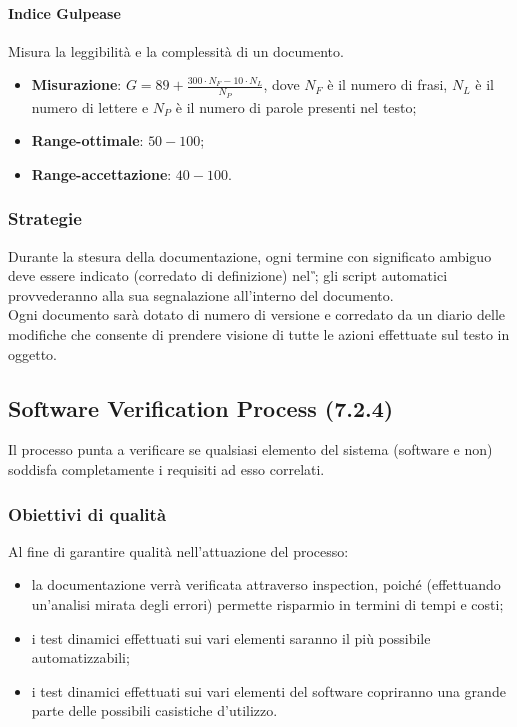 \paragraph{Indice Gulpease}
Misura la leggibilità e la complessità di un documento.
\begin{itemize}
\item \textbf{Misurazione}: $G = 89 + \frac{300\cdot{}N_{F}-10\cdot{}N_{L}}{N_{P}}$, dove $N_{F}$ è il numero di frasi, $N_{L}$ è il numero di lettere e $N_{P}$ è il numero di parole presenti nel testo;
\item \textbf{Range-ottimale}: $50 - 100$;
\item \textbf{Range-accettazione}: $40 - 100$.
\end{itemize}
\subsubsection{Strategie}
Durante la stesura della documentazione, ogni termine con significato ambiguo deve essere indicato (corredato di definizione) nel \textit{\G}; gli script automatici provvederanno alla sua segnalazione all'interno del documento.\\
Ogni documento sarà dotato di numero di versione e corredato da un diario delle modifiche che consente di prendere visione di tutte le azioni effettuate sul testo in oggetto.
\subsection{Software Verification Process (7.2.4)}
\label{soVerification}
Il processo punta a verificare se qualsiasi elemento del sistema (software e non) soddisfa completamente i requisiti ad esso correlati.
\subsubsection{Obiettivi di qualità}
Al fine di garantire qualità nell'attuazione del processo:
\begin{itemize}
\item la documentazione verrà verificata attraverso inspection, poiché (effettuando un'analisi mirata degli errori) permette risparmio in termini di tempi e costi;
\item i test dinamici effettuati sui vari elementi saranno il più possibile automatizzabili;
\item i test dinamici effettuati sui vari elementi del software copriranno una grande parte delle possibili casistiche d'utilizzo.
\end{itemize}
